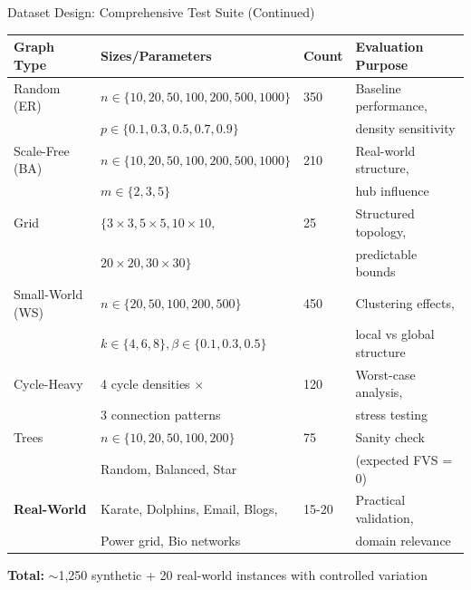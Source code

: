 \documentclass[aspectratio=169]{beamer}
\begin{document}
\begin{frame}{Dataset Design: Comprehensive Test Suite (Continued)}
\begin{table}
		\scriptsize
		\begin{tabular}{@{}lllp{4cm}@{}}
			\toprule
			\textbf{Graph Type}         & \textbf{Sizes/Parameters}                    & \textbf{Count} & \textbf{Evaluation Purpose}      \\ \midrule
			Random (ER)                 & $n \in \{10,20,50,100,200,500,1000\}$        & 350            & Baseline performance,            \\
			                            & $p \in \{0.1,0.3,0.5,0.7,0.9\}$              &                & density sensitivity              \\
			\midrule
			Scale-Free (BA)             & $n \in \{10,20,50,100,200,500,1000\}$        & 210            & Real-world structure,            \\
			                            & $m \in \{2,3,5\}$                            &                & hub influence                    \\
			\midrule
			Grid                        & $\{3\times3, 5\times5, 10\times10,$          & 25             & Structured topology,             \\
			                            & $20\times20, 30\times30\}$                   &                & predictable bounds               \\
			\midrule
			Small-World (WS)            & $n \in \{20,50,100,200,500\}$                & 450            & Clustering effects,              \\
			                            & $k \in \{4,6,8\}, \beta \in \{0.1,0.3,0.5\}$ &                & local vs global structure        \\
			\midrule
			Cycle-Heavy                 & 4 cycle densities $\times$                   & 120            & Worst-case analysis,             \\
			                            & 3 connection patterns                        &                & stress testing                   \\
			\midrule
			Trees                       & $n \in \{10,20,50,100,200\}$                 & 75             & Sanity check                     \\
			                            & Random, Balanced, Star                       &                & (expected FVS = 0)               \\
			\midrule
			\textbf{Real-World}         & Karate, Dolphins, Email, Blogs,              & 15-20          & Practical validation,            \\
			                            & Power grid, Bio networks                     &                & domain relevance                 \\ \bottomrule
		\end{tabular}
	\end{table}

	\textbf{Total:} $\sim$1,250 synthetic + 20 real-world instances with controlled variation
\end{frame}
\end{document}
